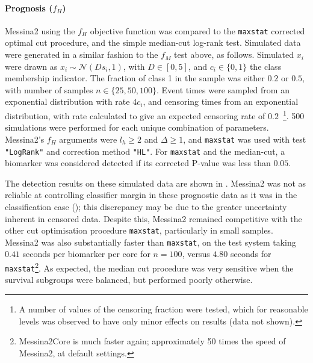 \documentclass[dissertation.tex]{subfiles}
\begin{document}
\paragraph{Prognosis ($f_H$)}
Messina2 using the $f_H$ objective function was compared to the \texttt{maxstat} corrected optimal cut procedure, and the simple median-cut log-rank test.  Simulated data were generated in a similar fashion to the $f_M$ test above, as follows.  Simulated $x_i$ were drawn as $x_i \sim \mathcal{N}(D s_i, 1)$, with $D \in [0, 5]$, and $c_i \in \{0, 1\}$ the class membership indicator.  The fraction of class 1 in the sample was either $0.2$ or $0.5$, with number of samples $n \in \{25, 50, 100\}$.  Event times were sampled from an exponential distribution with rate $4 c_i$, and censoring times from an exponential distribution, with rate calculated to give an expected censoring rate of $0.2$~\footnote{A number of values of the censoring fraction were tested, which for reasonable levels was observed to have only minor effects on results (data not shown).}.  500 simulations were performed for each unique combination of parameters.  Messina2's $f_H$ arguments were $l_h \geq 2$ and $\Delta \geq 1$, and \texttt{maxstat} was used with test \texttt{"LogRank"} and correction method \texttt{"HL"}.  For \texttt{maxstat} and the median-cut, a biomarker was considered detected if its corrected P-value was less than $0.05$.

The detection results on these simulated data are shown in .  Messina2 was not as reliable at controlling classifier margin in these prognostic data as it was in the classification case (); this discrepancy may be due to the greater uncertainty inherent in censored data.  Despite this, Messina2 remained competitive with the other cut optimisation procedure \texttt{maxstat}, particularly in small samples.  Messina2 was also substantially faster than \texttt{maxstat}, on the test system taking $0.41$ seconds per biomarker per core for $n = 100$, versus $4.80$ seconds for \texttt{maxstat}\footnote{Messina2Core is much faster again; approximately 50 times the speed of Messina2, at default settings.}.  As expected, the median cut procedure was very sensitive when the survival subgroups were balanced, but performed poorly otherwise.
\end{document}
